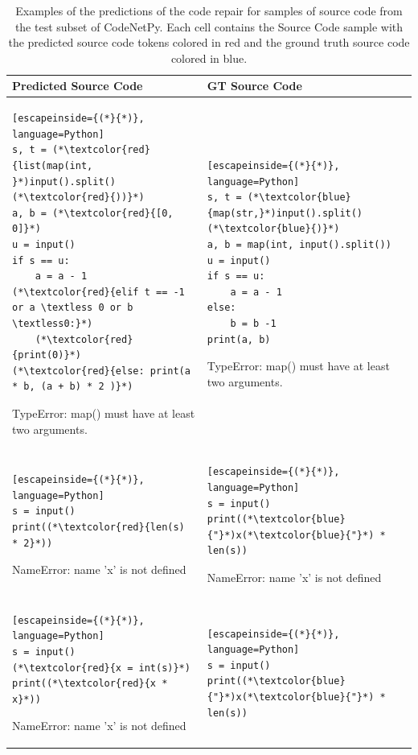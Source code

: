 \documentclass[12pt,a4paper]{report}
\begin{document}
\begin{appendices}
\begin{table}[H]\small\linespread{1}
\centering
\caption{Examples of the predictions of the code repair for samples of source code from the test subset of CodeNetPy. Each cell contains the Source Code sample with the predicted source code tokens colored in red and the ground truth source code colored in blue.}
\label{tab:appendices5}
\begin{tabular}{p{7.5cm} p{7.5cm}}
\textbf{Predicted Source Code} & \textbf{GT Source Code} \\
\hline
\begin{lstlisting}[escapeinside={(*}{*)}, language=Python]
s, t = (*\textcolor{red}{list(map(int, }*)input().split()(*\textcolor{red}{))}*)
a, b = (*\textcolor{red}{[0, 0]}*)
u = input()
if s == u:
    a = a - 1
(*\textcolor{red}{elif t == -1 or a \textless 0 or b \textless0:}*)
    (*\textcolor{red}{print(0)}*)
(*\textcolor{red}{else: print(a * b, (a + b) * 2 )}*)
\end{lstlisting}

TypeError: map() must have at least two arguments. & 
\begin{lstlisting}[escapeinside={(*}{*)}, language=Python]
s, t = (*\textcolor{blue}{map(str,}*)input().split()(*\textcolor{blue}{)}*)
a, b = map(int, input().split())
u = input()
if s == u:
    a = a - 1
else:
    b = b -1
print(a, b)
\end{lstlisting}

TypeError: map() must have at least two arguments.
\\

\hline
\begin{lstlisting}[escapeinside={(*}{*)}, language=Python]
s = input()
print((*\textcolor{red}{len(s) * 2}*))
\end{lstlisting}

NameError: name 'x' is not defined & 
\begin{lstlisting}[escapeinside={(*}{*)}, language=Python]
s = input()
print((*\textcolor{blue}{"}*)x(*\textcolor{blue}{"}*) * len(s))
\end{lstlisting}

NameError: name 'x' is not defined
\\

\hline
\begin{lstlisting}[escapeinside={(*}{*)}, language=Python]
s = input()
(*\textcolor{red}{x = int(s)}*)
print((*\textcolor{red}{x * x}*))
\end{lstlisting}

NameError: name 'x' is not defined & 
\begin{lstlisting}[escapeinside={(*}{*)}, language=Python]
s = input()
print((*\textcolor{blue}{"}*)x(*\textcolor{blue}{"}*) * len(s))
\end{lstlisting}


\end{tabular}
\end{table}
\end{appendices}
\end{document}
